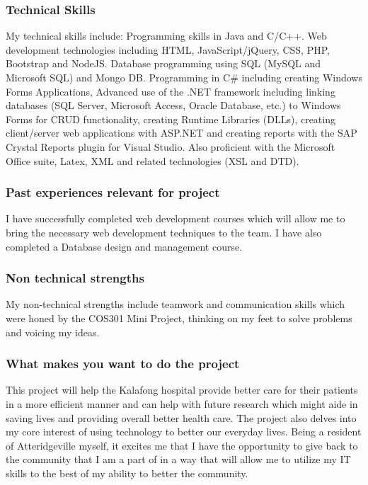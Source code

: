 \documentclass[hidelinks, 12pt, oneside]{article}
\begin{document}
\subsubsection{Technical Skills}
My technical skills include: Programming skills in Java and C/C++. Web development technologies including HTML, JavaScript/jQuery, CSS, PHP, Bootstrap and NodeJS. Database programming using SQL (MySQL and Microsoft SQL) and Mongo DB. Programming in C\# including creating Windows Forms Applications, Advanced use of the .NET framework including linking databases (SQL Server, Microsoft Access, Oracle Database, etc.) to Windows Forms for CRUD functionality, creating Runtime Libraries (DLLs), creating client/server web applications with ASP.NET and creating reports with the SAP Crystal Reports plugin for Visual Studio. Also proficient with the Microsoft Office suite, Latex, XML and related technologies (XSL and DTD).
\subsubsection{Past experiences relevant for project}
I have successfully completed web development courses which will allow me to bring the necessary web development techniques to the team. I have also completed a Database design and management course.
\subsubsection{Non technical strengths}
My non-technical strengths include teamwork and communication skills which were honed by the COS301 Mini Project, thinking on my feet to solve problems and voicing my ideas.
\subsubsection{What makes you want to do the project}
This project will help the Kalafong hospital provide better care for their patients in a more efficient manner and can help with future research which might aide in saving lives and providing overall better health care. The project also delves into my core interest of using technology to better our everyday lives. Being a resident of Atteridgeville myself, it excites me that I have the opportunity to give back to the community that I am a part of in a way that will allow me to utilize my IT skills to the best of my ability to better the community.
\end{document}
